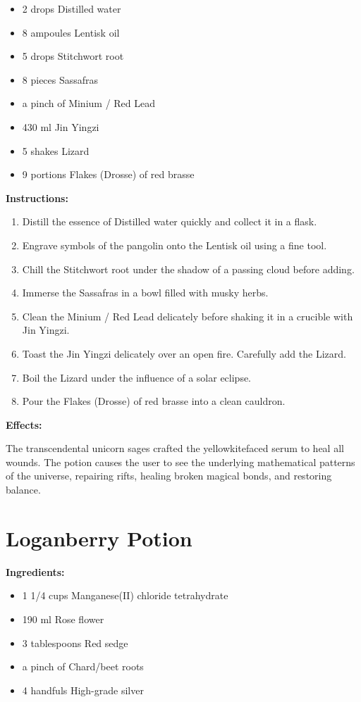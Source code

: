 \documentclass{article}
\begin{document}
\begin{itemize}
  \item 2 drops Distilled water
  \item 8 ampoules Lentisk oil
  \item 5 drops Stitchwort root
  \item 8 pieces Sassafras
  \item a pinch of Minium / Red Lead
  \item 430 ml Jin Yingzi
  \item 5 shakes Lizard
  \item 9 portions Flakes (Drosse) of red brasse
\end{itemize}

\textbf{Instructions:}

\begin{enumerate}
  \item Distill the essence of Distilled water quickly and collect it in a flask.
  \item Engrave symbols of the pangolin onto the Lentisk oil using a fine tool.
  \item Chill the Stitchwort root under the shadow of a passing cloud before adding.
  \item Immerse the Sassafras in a bowl filled with musky herbs.
  \item Clean the Minium / Red Lead delicately before shaking it in a crucible with Jin Yingzi.
  \item Toast the Jin Yingzi delicately over an open fire. Carefully add the Lizard.
  \item Boil the Lizard under the influence of a solar eclipse.
  \item Pour the Flakes (Drosse) of red brasse into a clean cauldron.
\end{enumerate}

\textbf{Effects:}

The transcendental unicorn sages crafted the yellowkitefaced serum to heal all wounds. The potion causes the user to see the underlying mathematical patterns of the universe, repairing rifts, healing broken magical bonds, and restoring balance.

\newpage
\section*{Loganberry Potion}

\textbf{Ingredients:}

\begin{itemize}
  \item 1 1/4 cups Manganese(II) chloride tetrahydrate
  \item 190 ml Rose flower
  \item 3 tablespoons Red sedge
  \item a pinch of Chard/beet  roots
  \item 4 handfuls High-grade silver
\end{itemize}
\end{document}
